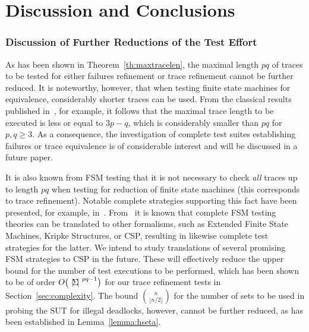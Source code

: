 \section{Discussion and Conclusions}
\label{sec:conc}

\subsubsection*{Discussion of Further Reductions of the Test Effort}
As has been shown in Theorem~\ref{th:maxtracelen}, the maximal length $pq$ of 
traces to be tested for either  failures refinement or trace refinement cannot be further reduced.
It is noteworthy, however, that when testing finite state machines for equivalence, considerably shorter traces can be used. From the classical results published in~\cite{chow:wmethod,vasilevskii1973}, for example, it follows that the maximal trace length to be executed is less or equal to $3p -q$, which is considerably smaller than $pq$ for $p,q\ge 3$.
As a consequence, the investigation of complete test suites establishing failures or trace equivalence is of considerable interest and will be discussed in a future paper.


It is also known from FSM
testing that it is not necessary to check {\it all} traces up to  
length $pq$ 
when testing for reduction of finite state machines (this corresponds to trace refinement). Notable complete strategies supporting this fact have been presented,
for example,
in~\cite{hierons_testing_2004,DBLP:conf/forte/DorofeevaEY05,petrenko_testing_2011,simao_reducing_2012}.
From~\cite{Huang2017} it is known that complete FSM testing theories can be
translated to other formalisms, such as Extended Finite State Machines,
Kripke Structures, or CSP, resulting in likewise complete test strategies for
the latter. We intend to study translations of several promising FSM
strategies to CSP in the future. These will effectively reduce the 
upper bound for the number of test executions to be performed, which  has been 
shown to be of order $O\big({~|\! \Sigma\!|~}^{pq-1}\big)$ for our trace refinement tests 
in Section~\ref{sec:complexity}.  The
bound $\binom{n}{\lfloor n/2\rfloor}$ for the number of sets to be used in probing the SUT for illegal
deadlocks, however, cannot be further reduced, as has been established in
Lemma~\ref{lemma:hseta}.

